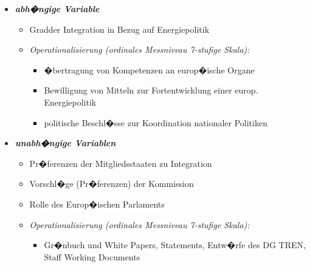 \documentclass[9pt,a4paper,ngerman]{report}
\begin{document}
	\begin{itemize}
		
		
		\item{\textcolor{midblue}{\textbf{\textsl{abh�ngige Variable}}}}	
			
			\begin{itemize}
				\item{Gradder Integration in Bezug auf Energiepolitik}
				\item{\textsl{Operationalisierung (ordinales Messniveau					
							\texttwelveudash {} 7-stufige Skala):}}
							
					\begin{itemize}
						\item{\textcolor{dunkelgrau.60}{�bertragung von 
									Kompetenzen an europ�ische Organe}}
						\item{\textcolor{dunkelgrau.60}{Bewilligung von Mitteln zur 
									Fortentwicklung einer europ. Energiepolitik}}
						\item{\textcolor{dunkelgrau.60}{politische Beschl�sse zur 
									Koordination nationaler Politiken}}
					\end{itemize}
					
			\end{itemize}
			
		\item{\textcolor{midblue}{\textbf{\textsl{unabh�ngige Variablen\marginpar{\scriptsize{\textcolor{Dschungelgr�n}{Ist der Entscheidungsmechanismus als Variable zu sehen?}}}}}}}
		
			\begin{itemize}
				\item{Pr�ferenzen der Mitgliedsstaaten zu Integration}
				\item{Vorschl�ge (Pr�ferenzen) der Kommission}
				\item{Rolle des Europ�ischen Parlaments}
				\item{\textsl{Operationalisierung (ordinales Messniveau					
							\texttwelveudash {} 7-stufige Skala):}}


		\reversemarginpar
									
							\begin{itemize}
							
				\reversemarginpar
					
					\item{\textcolor{dunkelgrau.60}{\marginpar{\scriptsize{\textcolor{cyan}{informelle Entscheidungsfindungsprozesse}}}Gr�nbuch und White 
												Papers, Statements, Entw�rfe des DG TREN, Staff 
												Working Documents}}
												

\end{itemize}
\end{itemize}
\end{itemize}
\end{document}
